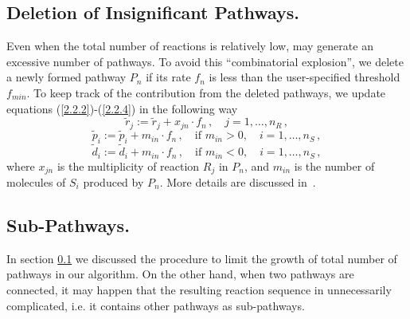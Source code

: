 \subsection{Deletion of Insignificant Pathways.}
\label{sec2c4}
Even when the total number of reactions is relatively low, \pump{} may generate an excessive number of pathways.  To avoid this ``combinatorial explosion'',  we delete a newly formed pathway $P_n$ if its rate $f_n$ is less than the user-specified threshold $f_{min}$.  To keep track of the contribution from the deleted pathways, we update equations (\ref{2.2.2})-(\ref{2.2.4}) in the following way
\begin{equation}
\tilde{r}_j := \tilde{r}_j + x_{jn}\cdot f_n\,,  \quad j = 1,\ldots, n_R\,,
\label{2.6.0}
\end{equation}
\begin{equation}
\tilde{p}_i := \tilde{p}_i + m_{in}\cdot f_n\,, \quad \textrm{if } m_{in} >0, \quad i = 1,\ldots, n_S\,,
\label{2.6.1}
\end{equation}
\begin{equation}
\tilde{d}_i := \tilde{d}_i + m_{in}\cdot f_n\,, \quad \textrm{if } m_{in} <0, \quad i = 1,\ldots, n_S\,,
\label{2.6.2}
\end{equation}
 where $x_{jn}$ is the multiplicity of reaction $R_j$ in $P_n$, and $m_{in}$ is the number of molecules of $S_i$ produced by $P_n$. More details are discussed in~\cite{Lehman2003}.
  

\subsection{Sub-Pathways.}
\label{sec2c5}
In section \ref{sec2c4} we discussed the procedure to limit the growth of total number of pathways in our algorithm.  On the other hand, when two pathways are connected, it may happen that the resulting reaction sequence in unnecessarily complicated, i.e. it contains other pathways as sub-pathways. 

